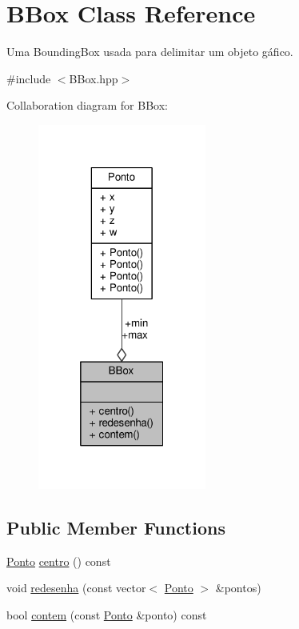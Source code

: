 \hypertarget{classBBox}{\section{B\+Box Class Reference}
\label{classBBox}
}


Uma Bounding\+Box usada para delimitar um objeto gáfico.  




{\ttfamily \#include $<$B\+Box.\+hpp$>$}



Collaboration diagram for B\+Box\+:
\nopagebreak
\begin{figure}[H]
\begin{center}
\leavevmode
\includegraphics[width=157pt]{classBBox__coll__graph}
\end{center}
\end{figure}
\subsection*{Public Member Functions}
\begin{DoxyCompactItemize}
\item 
\hyperlink{classPonto}{Ponto} \hyperlink{classBBox_a4aad8901de813b3339be3a1770c45ac0}{centro} () const 
\item 
void \hyperlink{classBBox_a820d32399477f89718bf78a3b7de84ec}{redesenha} (const vector$<$ \hyperlink{classPonto}{Ponto} $>$ \&pontos)
\item 
bool \hyperlink{classBBox_a24fa2b41697cd58987a1113e437772d6}{contem} (const \hyperlink{classPonto}{Ponto} \&ponto) const 
\end{DoxyCompactItemize}

